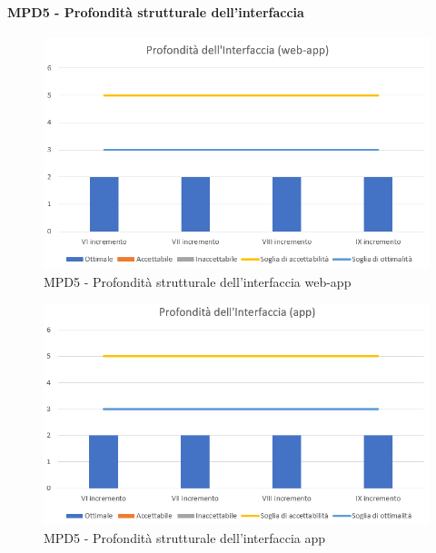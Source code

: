   \clearpage
  \paragraph{MPD5 - Profondità strutturale dell’interfaccia}
  \begin{figure}[h!]
    \centering
      \includegraphics[scale=1]{Immagini/ProfInter WAA.PNG}
    \caption{MPD5 - Profondità strutturale dell’interfaccia web-app}
  \end{figure}

  \begin{figure}[h!]
    \centering
      \includegraphics[scale=1]{Immagini/ProfInter APPA.PNG}
    \caption{MPD5 - Profondità strutturale dell’interfaccia app}
  \end{figure}
